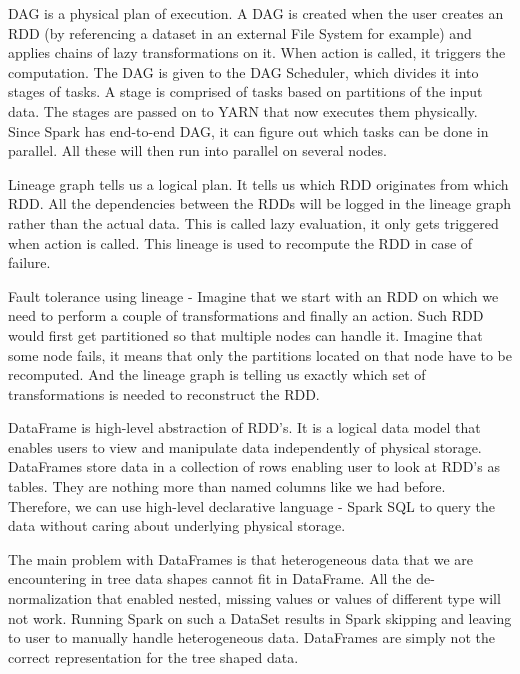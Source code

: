 DAG is a physical plan of execution. A DAG is created when the user creates an RDD (by referencing a dataset in an external File System for example) and applies chains of lazy transformations on it. When action is called, it triggers the computation. The DAG is given to the DAG Scheduler, which divides it into stages of tasks. A stage is comprised of tasks based on partitions of the input data. The stages are passed on to YARN that now executes them physically. Since Spark has end-to-end DAG, it can figure out which tasks can be done in parallel. All these will then run into parallel on several nodes. \cite{BigDataCourse} %

Lineage graph tells us a logical plan. It tells us which RDD originates from which RDD. All the dependencies between the RDDs will be logged in the lineage graph rather than the actual data. This is called lazy evaluation, it only gets triggered when action is called. This lineage is used to recompute the RDD in case of failure.

Fault tolerance using lineage - Imagine that we start with an RDD on which we need to perform a couple of transformations and finally an action. Such RDD would first get partitioned so that multiple nodes can handle it. Imagine that some node fails, it means that only the partitions located on that node have to be recomputed. And the lineage graph is telling us exactly which set of transformations is needed to reconstruct the RDD.

DataFrame is high-level abstraction of RDD's. It is a logical data model that enables users to view and manipulate data independently of physical storage. DataFrames store data in a collection of rows enabling user to look at RDD's as tables. They are nothing more than named columns like we had before. Therefore, we can use high-level declarative language - Spark SQL to query the data without caring about underlying physical storage.

The main problem with DataFrames is that heterogeneous data that we are encountering in tree data shapes cannot fit in DataFrame. All the de-normalization that enabled nested, missing values or values of different type will not work. Running Spark on such a DataSet results in Spark skipping and leaving to user to manually handle heterogeneous data. DataFrames are simply not the correct representation for the tree shaped data. 

